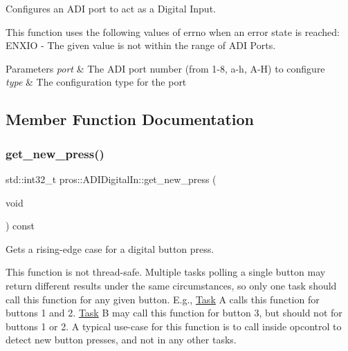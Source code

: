 Configures an A\+DI port to act as a Digital Input.

This function uses the following values of errno when an error state is reached\+: E\+N\+X\+IO -\/ The given value is not within the range of A\+DI Ports.


\begin{DoxyParams}{Parameters}
{\em port} & The A\+DI port number (from 1-\/8, \textquotesingle{}a\textquotesingle{}-\/\textquotesingle{}h\textquotesingle{}, \textquotesingle{}A\textquotesingle{}-\/\textquotesingle{}H\textquotesingle{}) to configure \\
\hline
{\em type} & The configuration type for the port \\
\hline
\end{DoxyParams}


\subsection{Member Function Documentation}
\mbox{\label{classpros_1_1ADIDigitalIn_a27d82a95e717eeee61ed6555952a93d8}} 
\subsubsection{\texorpdfstring{get\+\_\+new\+\_\+press()}{get\_new\_press()}}
{\footnotesize\ttfamily std\+::int32\+\_\+t pros\+::\+A\+D\+I\+Digital\+In\+::get\+\_\+new\+\_\+press (\begin{DoxyParamCaption}\item[{void}]{ }\end{DoxyParamCaption}) const}

Gets a rising-\/edge case for a digital button press.

This function is not thread-\/safe. Multiple tasks polling a single button may return different results under the same circumstances, so only one task should call this function for any given button. E.\+g., \hyperlink{classpros_1_1Task}{Task} A calls this function for buttons 1 and 2. \hyperlink{classpros_1_1Task}{Task} B may call this function for button 3, but should not for buttons 1 or 2. A typical use-\/case for this function is to call inside opcontrol to detect new button presses, and not in any other tasks.

